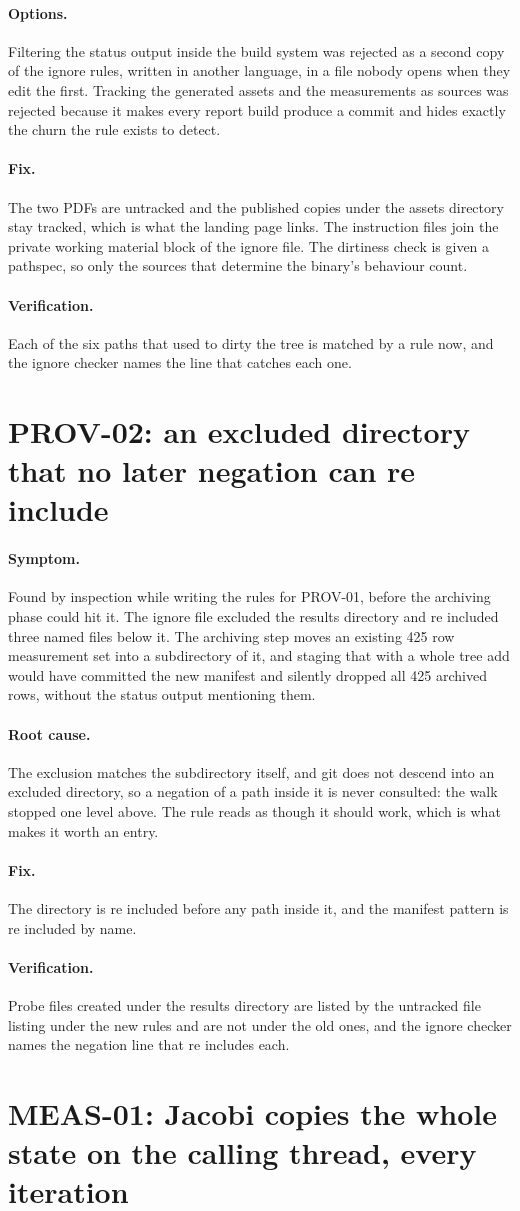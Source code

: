 \documentclass[11pt,a4paper]{report}
\newcommand{\symptom}[1]{\paragraph{Symptom.}#1}
\newcommand{\rootcause}[1]{\paragraph{Root cause.}#1}
\newcommand{\options}[1]{\paragraph{Options.}#1}
\newcommand{\fix}[1]{\paragraph{Fix.}#1}
\newcommand{\verification}[1]{\paragraph{Verification.}#1}
\begin{document}
\options{Filtering the status output inside the build system was rejected as a
second copy of the ignore rules, written in another language, in a file nobody
opens when they edit the first. Tracking the generated assets and the
measurements as sources was rejected because it makes every report build produce
a commit and hides exactly the churn the rule exists to detect.}

\fix{The two PDFs are untracked and the published copies under the assets
directory stay tracked, which is what the landing page links. The instruction
files join the private working material block of the ignore file. The dirtiness
check is given a pathspec, so only the sources that determine the binary's
behaviour count.}

\verification{Each of the six paths that used to dirty the tree is matched by a
rule now, and the ignore checker names the line that catches each one.}

\section{PROV-02: an excluded directory that no later negation can re include}

\symptom{Found by inspection while writing the rules for PROV-01, before the
archiving phase could hit it. The ignore file excluded the results directory and
re included three named files below it. The archiving step moves an existing 425
row measurement set into a subdirectory of it, and staging that with a whole tree
add would have committed the new manifest and silently dropped all 425 archived
rows, without the status output mentioning them.}

\rootcause{The exclusion matches the subdirectory itself, and git does not
descend into an excluded directory, so a negation of a path inside it is never
consulted: the walk stopped one level above. The rule reads as though it should
work, which is what makes it worth an entry.}

\fix{The directory is re included before any path inside it, and the manifest
pattern is re included by name.}

\verification{Probe files created under the results directory are listed by the
untracked file listing under the new rules and are not under the old ones, and
the ignore checker names the negation line that re includes each.}

\section{MEAS-01: Jacobi copies the whole state on the calling thread, every iteration}
\end{document}
